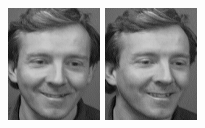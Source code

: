 \begin{figure}[ht]
 \includegraphics[width=\columnwidth/11]{ch3/figures/s3_1.png}
 \includegraphics[width=\columnwidth/11]{ch3/figures/s3_2.png}

\end{figure}
